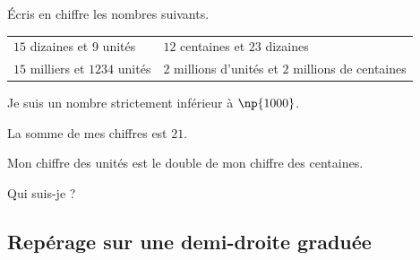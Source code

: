 \documentclass[a4paper,10pt]{report}
\begin{document}
\begin{ex}
Écris en chiffre les nombres suivants.
\begin{enumerate}
\begin{tabular}{m{7cm}m{7cm}}
\item $15$ dizaines et 9 unités&
\item $12$ centaines et $23$ dizaines\\
\item $15$ milliers et $1234$ unités&
\item $2$ millions d'unités et $2$ millions de centaines\\
\end{tabular}
\end{enumerate}
\end{ex}

\begin{ex}
Je suis un nombre strictement inférieur à $\np{1000}$. 

\medskip
\noindent La somme de mes chiffres est $21$. 

\medskip
\noindent Mon chiffre des unités est le double de mon chiffre des centaines. 

\medskip
\noindent Qui suis-je ?
\end{ex}

\newpage
\subsection*{Repérage sur une demi-droite graduée}
\end{document}
